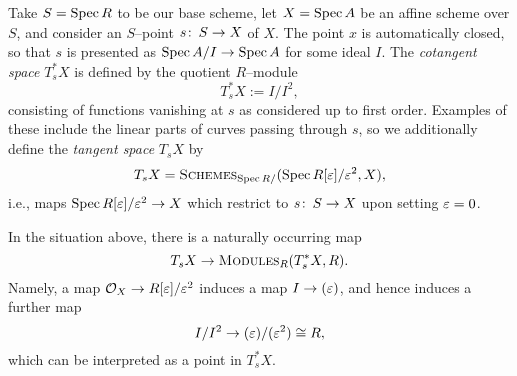 \begin{definition}\label{DefnOfCoTangentSpaces}
Take \(S = \operatorname{Spec} R\) to be our base scheme, let \(X = \operatorname{Spec} A\) be an affine scheme over \(S\), and consider an \(S\)--point \(s\colon\thinspace S \to X\) of \(X\).  The point \(x\) is automatically closed, so that \(s\) is presented as \(\operatorname{Spec} A/I \to \operatorname{Spec} A\) for some ideal \(I\).  The \textit{cotangent space} \(T^*_s X\) is defined by the quotient \(R\)--module \[T^*_s X := I / I^2,\] consisting of functions vanishing at \(s\) as considered up to first order.  Examples of these include the linear parts of curves passing through \(s\), so we additionally define the \textit{tangent space} \(T_s X\) by \[T_s X = \normalfont\textsc{Schemes}_{\operatorname{Spec} R/}(\operatorname{Spec} R[\varepsilon] / \varepsilon^2, X),\] i.e., maps \(\operatorname{Spec} R[\varepsilon] / \varepsilon^2 \to X\) which restrict to \(s\colon\thinspace S \to X\) upon setting \(\varepsilon = 0\).
\end{definition}

\begin{remark}
In the situation above, there is a naturally occurring map \[T_s X \to \normalfont\textsc{Modules}_R(T^*_s X, R).\]  Namely, a map \(\mathcal{O}_X \to R[\varepsilon] / \varepsilon^2\) induces a map \(I \to (\varepsilon)\), and hence induces a further map \[I / I^2 \to (\varepsilon) / (\varepsilon^2) \cong R,\] which can be interpreted as a point in \(T^*_s X\).
\end{remark}

